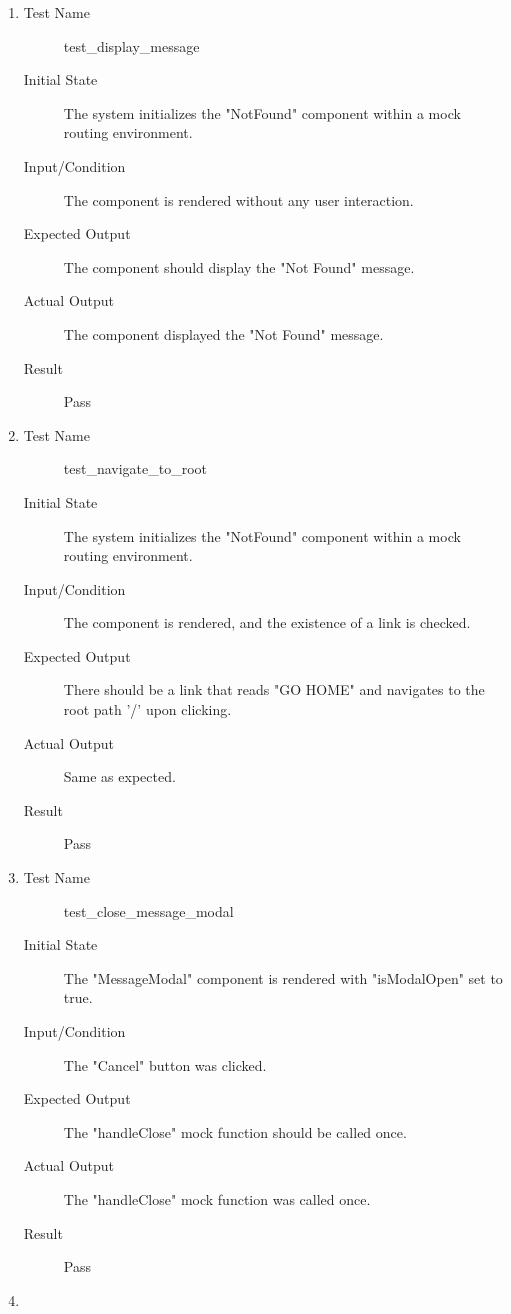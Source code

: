 \documentclass[12pt, titlepage]{article}
\begin{document}
\begin{enumerate}[UT-OT1]
  \item \label{UT-OT1}
    \begin{description}
    \item[Test Name] test\_display\_message
    \item[Initial State] The system initializes the "NotFound" component within a mock routing environment.
    \item[Input/Condition] The component is rendered without any user interaction.
    \item[Expected Output] The component should display the "Not Found" message.
    \item[Actual Output] The component displayed the "Not Found" message.
    \item[Result] Pass
    \end{description}
  \item \label{UT-OT2}
    \begin{description}
    \item[Test Name] test\_navigate\_to\_root
    \item[Initial State] The system initializes the "NotFound" component within a mock routing environment.
    \item[Input/Condition] The component is rendered, and the existence of a link is checked.
    \item[Expected Output] There should be a link that reads "GO HOME" and navigates to the root path '/' upon clicking.
    \item[Actual Output] Same as expected.
    \item[Result] Pass
    \end{description}
  \item \label{UT-OT3}
    \begin{description}
    \item[Test Name] test\_close\_message\_modal
    \item[Initial State] The "MessageModal" component is rendered with "isModalOpen" set to true.
    \item[Input/Condition]  The "Cancel" button was clicked.
    \item[Expected Output] The "handleClose" mock function should be called once.
    \item[Actual Output] The "handleClose" mock function was called once.
    \item[Result] Pass
    \end{description}
  \item \label{UT-OT4}

\end{enumerate}
\end{document}
